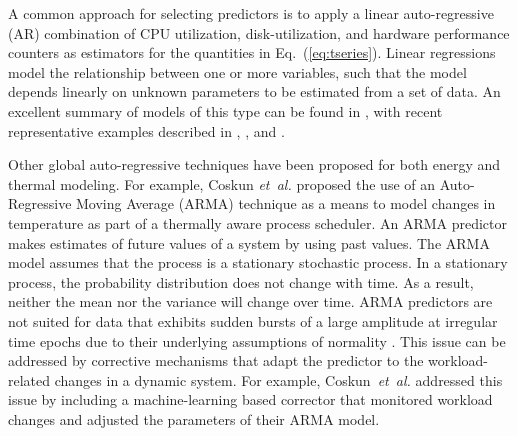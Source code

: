 \documentclass[times,10pt,finalversion]{usetex-v1}
\begin{document}
A common approach for selecting predictors is to apply a linear
auto-regressive (AR) combination of CPU utilization, disk-utilization,
and hardware performance counters as estimators for the quantities in
Eq.~(\ref{eq:tseries}).  Linear regressions model the relationship
between one or more variables, such that the model depends linearly on
unknown parameters to be estimated from a set of data.  An excellent
summary of models of this type can be found in \cite{Rivoire2008}, with
recent representative examples described in \cite{Lewis2008},
\cite{Bhattacharjee2009}, and \cite{Reich2010}.

Other global auto-regressive techniques have been proposed for both
energy and thermal modeling.  For example, Coskun \textit{et~al.}
\cite{Coskun2008} proposed the use of an Auto-Regressive Moving Average
(ARMA) technique as a means to model changes in temperature as part of a
thermally aware process scheduler.  An ARMA predictor makes estimates of
future values of a system by using past values. The ARMA model
assumes that the process is a stationary stochastic process. In a
stationary process, the probability distribution does not change with
time. As a result, neither the mean nor the variance will change over
time.  ARMA predictors are not suited for data that exhibits sudden
bursts of a large amplitude at irregular time epochs due to their
underlying assumptions of normality \cite{Tong1993}. This issue can be
addressed by corrective mechanisms that adapt the predictor to the
workload-related changes in a dynamic system.  For example,
Coskun~\textit{et~al.}\cite{Coskun2008} addressed this issue by
including a machine-learning based corrector that monitored workload
changes and adjusted the parameters of their ARMA model.
\end{document}
